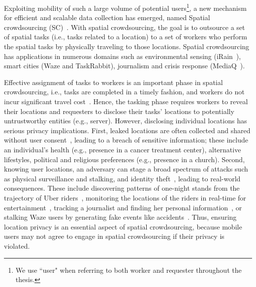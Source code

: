 \documentclass{USC-Thesis}
\numberwithin{equation}{chapter}
\begin{document}
Exploiting mobility of such a large volume of potential users\footnote{We use ``user" when referring to both worker and requester throughout the thesis.}, a new mechanism for efficient and scalable data collection has emerged, named Spatial crowdsourcing (SC)~\cite{kazemi2012geocrowd}. With spatial crowdsourcing, the goal is to outsource a set of spatial tasks (i.e., tasks related to a location) to a set of workers who perform the spatial tasks by physically traveling to those locations. Spatial crowdsourcing has applications in numerous domains such as environmental sensing (iRain~\cite{iRain}), smart cities (Waze and TaskRabbit), journalism and crisis response (MediaQ~\cite{kim2014mediaq}).

Effective assignment of tasks to workers is an important phase in spatial crowdsourcing, i.e., tasks are completed in a timely fashion, and workers do not incur significant travel cost~\cite{kazemi2012geocrowd,kazemi2013geotrucrowd,deng2013maximizing,to2016real}. 
Hence, the tasking phase requires workers to reveal their locations and requesters to disclose their tasks' locations to potentially untrustworthy entities (e.g., server). However, disclosing individual locations has serious privacy implications. First, leaked locations are often collected and shared without user consent~\cite{Forbes2015,angwin2011,mcmillan2014}, leading to a breach of sensitive information; these include an individual's health (e.g., presence in a cancer treatment center), alternative lifestyles, political and religious preferences (e.g., presence in a church). Second, knowing user locations, an adversary can stage a broad spectrum of attacks such as physical surveillance and stalking, and identity theft~\cite{scheck2010}, leading to real-world consequences. These include discovering patterns of one-night stands from the trajectory of Uber riders~\cite{Perry2014}, monitoring the locations of the riders in real-time for entertainment~\cite{Forbes2014}, tracking a journalist and finding her personal information~\cite{usatoday2014}, or stalking Waze users by generating fake events like accidents~\cite{Wang2016}.
Thus, ensuring location privacy is an essential aspect of spatial crowdsourcing, because mobile users
may not agree to engage in spatial crowdsourcing if their privacy is violated.
\end{document}
